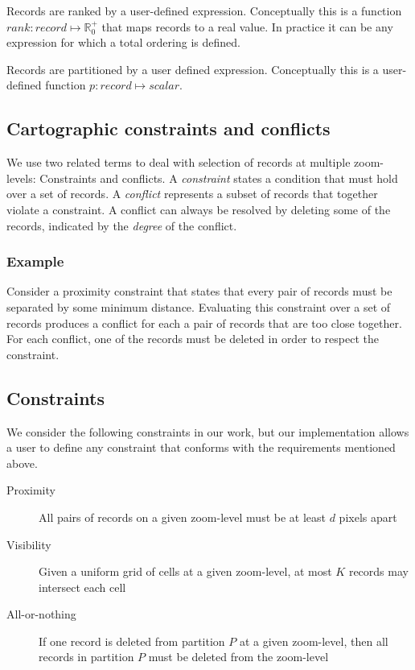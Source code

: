 Records are ranked by a user-defined expression. Conceptually this is a function $rank: record \mapsto \mathbb{R}_0^+$ that maps records to a real value. In practice it can be any expression for which a total ordering is defined.

Records are partitioned by a user defined expression. Conceptually this is a user-defined function $p: record \mapsto scalar$.

\subsection{Cartographic constraints and conflicts}

We use two related terms to deal with selection of records at multiple zoom-levels: Constraints and conflicts. A \emph{constraint} states a condition that must hold over a set of records. A \emph{conflict} represents a subset of records that together violate a constraint. A conflict can always be resolved by deleting some of the records, indicated by the \emph{degree} of the conflict.

\subsubsection{Example}
Consider a proximity constraint that states that every pair of records must be separated by some minimum distance. Evaluating this constraint over a set of records produces a conflict for each a pair of records that are too close together. For each conflict, one of the records must be deleted in order to respect the constraint.

\subsection{Constraints}
We consider the following constraints in our work, but our implementation allows a user to define any constraint that conforms with the requirements mentioned above. 

\begin{description}
\item [Proximity] All pairs of records on a given zoom-level must be at least $d$ pixels apart
\item [Visibility] Given a uniform grid of cells at a given zoom-level, at most $K$ records may intersect each cell
\item [All-or-nothing] If one record is deleted from partition $P$ at a given zoom-level, then all records in partition $P$ must be deleted from the zoom-level
\end{description}

